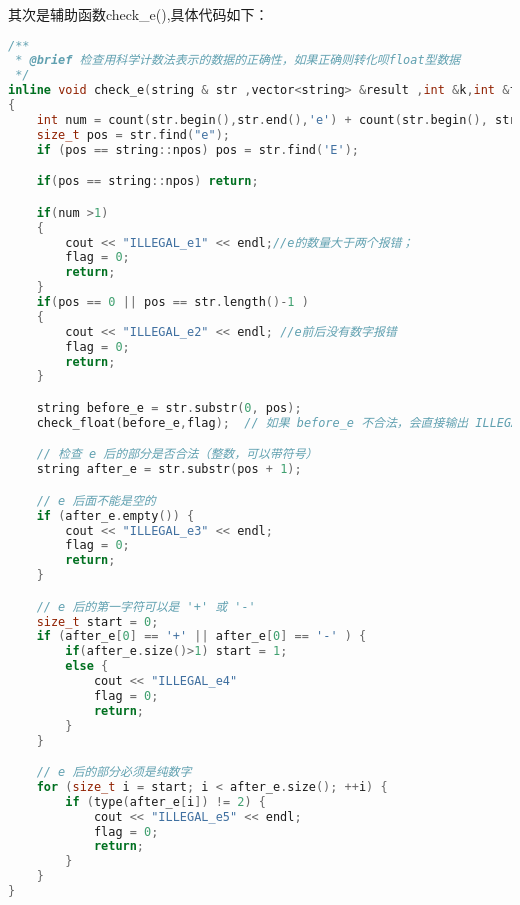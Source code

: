 \documentclass[fontset=fandol]{ctexart}
\begin{document}
其次是辅助函数check\_e(),具体代码如下：
\begin{lstlisting}[language=C++, caption={check\_e()}]
/**
 * @brief 检查用科学计数法表示的数据的正确性，如果正确则转化呗float型数据
 */
inline void check_e(string & str ,vector<string> &result ,int &k,int &flag)
{
    int num = count(str.begin(),str.end(),'e') + count(str.begin(), str.end(), 'E');
    size_t pos = str.find("e");
    if (pos == string::npos) pos = str.find('E');

    if(pos == string::npos) return;

    if(num >1) 
    {
        cout << "ILLEGAL_e1" << endl;//e的数量大于两个报错；
        flag = 0;
        return;
    }
    if(pos == 0 || pos == str.length()-1 )
    {
        cout << "ILLEGAL_e2" << endl; //e前后没有数字报错
        flag = 0;
        return;
    }

    string before_e = str.substr(0, pos);
    check_float(before_e,flag);  // 如果 before_e 不合法，会直接输出 ILLEGAL 并返回

    // 检查 e 后的部分是否合法（整数，可以带符号）
    string after_e = str.substr(pos + 1);

    // e 后面不能是空的
    if (after_e.empty()) {
        cout << "ILLEGAL_e3" << endl;
        flag = 0;
        return;
    }

    // e 后的第一字符可以是 '+' 或 '-'
    size_t start = 0;
    if (after_e[0] == '+' || after_e[0] == '-' ) {
        if(after_e.size()>1) start = 1;
        else {
            cout << "ILLEGAL_e4"
            flag = 0;
            return;
        }
    }

    // e 后的部分必须是纯数字
    for (size_t i = start; i < after_e.size(); ++i) {
        if (type(after_e[i]) != 2) {
            cout << "ILLEGAL_e5" << endl;
            flag = 0;
            return;
        }
    }
}
\end{lstlisting}
\end{document}
